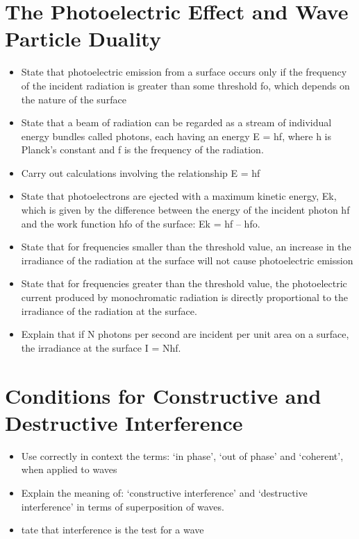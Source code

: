 \section{The Photoelectric Effect and Wave Particle Duality}
\begin{multicols}{2}
	\begin{itemize}
        \item State that photoelectric emission from a surface occurs only if the
            frequency of the incident radiation is greater than some threshold
            fo, which depends on the nature of the surface 

        \item State that a beam of radiation can be regarded as a stream of
            individual energy bundles called photons, each having an energy
            E = hf, where h is Planck’s constant and f is the frequency of the
            radiation.

        \item Carry out calculations involving the relationship E = hf


        \item State that photoelectrons are ejected with a maximum kinetic energy,
             Ek, which is given by the difference between the energy of the
            incident photon hf and the work function hfo of the surface:
            Ek = hf – hfo.

        \item State that for frequencies smaller than the threshold value, an increase
            in the irradiance of the radiation at the surface will not cause
            photoelectric emission

        \item State that for frequencies greater than the threshold value, the
            photoelectric current produced by monochromatic radiation is
            directly proportional to the irradiance of the radiation at the surface.

        \item Explain that if N photons per second are incident per unit area on a
            surface, the irradiance at the surface I = Nhf.
	\end{itemize}
\end{multicols}

\section{Conditions for Constructive and Destructive Interference}
\begin{multicols}{2}
	\begin{itemize}
        \item  Use correctly in context the terms: ‘in phase’, ‘out of phase’ and
            ‘coherent’, when applied to waves
        \item Explain the meaning of: ‘constructive interference’ and ‘destructive
            interference’ in terms of superposition of waves.
        \item tate that interference is the test for a wave
	\end{itemize}
\end{multicols}


